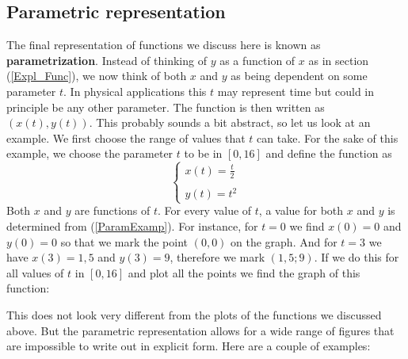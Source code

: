 \subsection{Parametric representation}

\noindent The final representation of functions we discuss here is known as \textbf{parametrization}. Instead of thinking of $y$ as a function of $x$ as in section (\ref{Expl_Func}), we now think of both $x$ and $y$ as being dependent on some parameter $t$. In physical applications this $t$ may represent time but could in principle be any other parameter. The function is then written as $\left( x(t), y(t) \right)$. This probably sounds a bit abstract, so let us look at an example. We first choose the range of values that $t$ can take. For the sake of this example, we choose the parameter $t$ to be in $\left[ 0,16 \right]$ and define the function as
\begin{equation}
\label{ParamExamp}
\left\{
\begin{array}{ll}
 x(t) = \frac{t}{2} \\\\
y(t) = t^2 
\end{array}
\right. 
\end{equation}
Both $x$ and $y$ are functions of $t$. For every value of $t$, a value for both $x$ and $y$ is determined from (\ref{ParamExamp}). For instance, for $t=0$ we find $x(0) = 0$ and $y(0)=0$ so that we mark the point $\left( 0,0 \right)$ on the graph. And for $t=3$ we have $x(3)=1,5$ and $y(3)=9$, therefore we mark $\left( 1,5 ; 9 \right)$. If we do this for all values of $t$ in $\left[ 0,16 \right]$ and plot all the points we find the graph of this function:
\begin{center}
\end{center}
\noindent This does not look very different from the plots of the functions we discussed above. But the parametric representation allows for a wide range of figures that are impossible to write out in explicit form. Here are a couple of examples:
